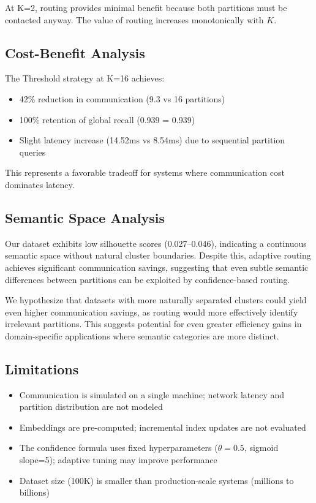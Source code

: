 \documentclass[10pt,twocolumn]{article}
\begin{document}
At K=2, routing provides minimal benefit because both partitions must be contacted anyway. The value of routing increases monotonically with $K$.

\subsection{Cost-Benefit Analysis}

The Threshold strategy at K=16 achieves:
\begin{itemize}
    \item 42\% reduction in communication (9.3 vs 16 partitions)
    \item 100\% retention of global recall (0.939 = 0.939)
    \item Slight latency increase (14.52ms vs 8.54ms) due to sequential partition queries
\end{itemize}

This represents a favorable tradeoff for systems where communication cost dominates latency.

\subsection{Semantic Space Analysis}

Our dataset exhibits low silhouette scores (0.027--0.046), indicating a continuous semantic space without natural cluster boundaries. Despite this, adaptive routing achieves significant communication savings, suggesting that even subtle semantic differences between partitions can be exploited by confidence-based routing.

We hypothesize that datasets with more naturally separated clusters could yield even higher communication savings, as routing would more effectively identify irrelevant partitions. This suggests potential for even greater efficiency gains in domain-specific applications where semantic categories are more distinct.

\subsection{Limitations}

\begin{itemize}
    \item Communication is simulated on a single machine; network latency and partition distribution are not modeled
    \item Embeddings are pre-computed; incremental index updates are not evaluated
    \item The confidence formula uses fixed hyperparameters ($\theta=0.5$, sigmoid slope=5); adaptive tuning may improve performance
    \item Dataset size (100K) is smaller than production-scale systems (millions to billions)
\end{itemize}
\end{document}
